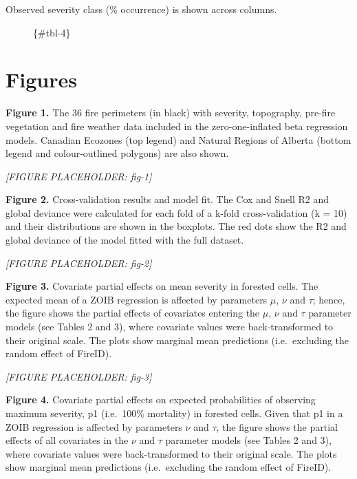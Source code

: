 \documentclass[
  numafflabel,
  authoryear,
  preprint]{elsarticle}
\begin{document}
\begin{description}
\item[Observed severity class (\% occurrence) is shown across columns.]
\{\#tbl-4\}
\end{description}

\section{Figures}\label{figures}

\newpage{}

\textbf{Figure 1.} The 36 fire perimeters (in black) with severity,
topography, pre-fire vegetation and fire weather data included in the
zero-one-inflated beta regression models. Canadian Ecozones (top legend)
and Natural Regions of Alberta (bottom legend and colour-outlined
polygons) are also shown.

\emph{{[}FIGURE PLACEHOLDER: fig-1{]}}

\newpage{}

\textbf{Figure 2.} Cross-validation results and model fit. The Cox and
Snell R2 and global deviance were calculated for each fold of a k-fold
cross-validation (k = 10) and their distributions are shown in the
boxplots. The red dots show the R2 and global deviance of the model
fitted with the full dataset.

\emph{{[}FIGURE PLACEHOLDER: fig-2{]}}

\newpage{}

\textbf{Figure 3.} Covariate partial effects on mean severity in
forested cells. The expected mean of a ZOIB regression is affected by
parameters \(\mu\), \(\nu\) and \(\tau\); hence, the figure shows the
partial effects of covariates entering the \(\mu\), \(\nu\) and \(\tau\)
parameter models (see Tables 2 and 3), where covariate values were
back-transformed to their original scale. The plots show marginal mean
predictions (i.e.~excluding the random effect of FireID).

\emph{{[}FIGURE PLACEHOLDER: fig-3{]}}

\newpage{}

\textbf{Figure 4.} Covariate partial effects on expected probabilities
of observing maximum severity, p1 (i.e.~100\% mortality) in forested
cells. Given that p1 in a ZOIB regression is affected by parameters
\(\nu\) and \(\tau\), the figure shows the partial effects of all
covariates in the \(\nu\) and \(\tau\) parameter models (see Tables 2
and 3), where covariate values were back-transformed to their original
scale. The plots show marginal mean predictions (i.e.~excluding the
random effect of FireID).
\end{document}
